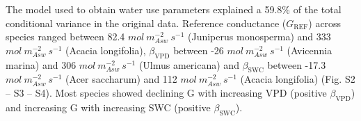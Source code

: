 \documentclass[11pt,twoside]{reedthesis}
\begin{document}
The model used to obtain water use parameters explained a 59.8\% of the
total conditional variance in the original data. Reference conductance
(\(G_{\text{REF}}\)) across species ranged between 82.4
\(mol\: m_{Asw}^{-2}\: s^{-1}\) (Juniperus monosperma) and 333
\(mol\: m_{Asw}^{-2}\: s^{-1}\) (Acacia longifolia),
\(\beta_{\text{VPD}}\) between -26 \(mol\: m_{Asw}^{-2}\: s^{-1}\)
(Avicennia marina) and 306 \(mol\: m_{Asw}^{-2}\: s^{-1}\) (Ulmus
americana) and \(\beta_{\text{SWC}}\) between -17.3
\(mol\: m_{Asw}^{-2}\: s^{-1}\) (Acer saccharum) and 112
\(mol \: m_{Asw}^{-2}\: s^{-1}\) (Acacia longifolia) (Fig. S2 -- S3 --
S4). Most species showed declining G with increasing VPD (positive
\(\beta_{\text{VPD}}\)) and increasing G with increasing SWC (positive
\(\beta_{\text{SWC}}\)).\par
\end{document}
